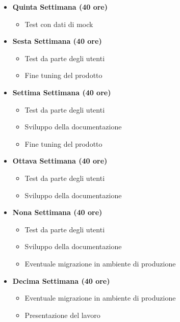 {\begin{itemize}
\begin{itemize}
		\end{itemize}
		\item \textbf{Quinta Settimana (40 ore)} 
		\begin{itemize}
			\item Test con dati di mock
		\end{itemize}
		\item \textbf{Sesta Settimana (40 ore)} 
		\begin{itemize}
			\item Test da parte degli utenti
			\item Fine tuning del prodotto
		\end{itemize}
		\item \textbf{Settima Settimana (40 ore)} 
		\begin{itemize}
			\item Test da parte degli utenti
			\item Sviluppo della documentazione
			\item Fine tuning del prodotto
		\end{itemize}
		\item \textbf{Ottava Settimana (40 ore)} 
		\begin{itemize}
			\item Test da parte degli utenti
			\item Sviluppo della documentazione
		\end{itemize}
		\item \textbf{Nona Settimana (40 ore)} 
		\begin{itemize}
			\item Test da parte degli utenti
			\item Sviluppo della documentazione
			\item Eventuale migrazione in ambiente di produzione
		\end{itemize}
		\item \textbf{Decima Settimana (40 ore)} 
		\begin{itemize}
			\item Eventuale migrazione in ambiente di produzione
			\item Presentazione del lavoro
		\end{itemize}
    \end{itemize}
}

\newcommand{\totaleOre}{}

\newcommand{\obiettiviObbligatori}{
	 \item \underline{\textit{O01}}: tutti i software del nuovo sistema devono essere correttamente configurati;
 	 \item \underline{\textit{O02}}: tutti i software del nuovo sistema devono essere in grado di comunicare tra loro;
	 \item \underline{\textit{O03}}: deve essere presente una documentazione chiara ed appropriata sia per chi utilizza il software sia per chi lo andrà a mantenere;
	 
}

